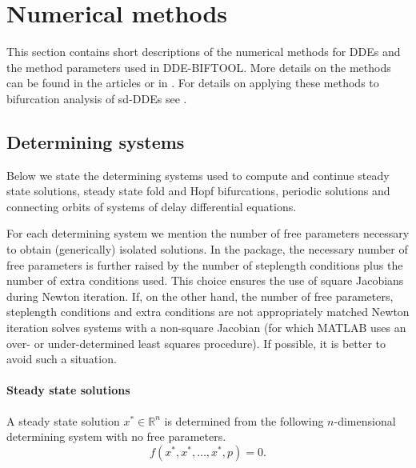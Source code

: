 \documentclass[10pt]{scrartcl}
\newcommand{\DDEBIFCODE}{\textsc{DDE-BIFTOOL}}
\newcommand{\RR}{\mathbb{R}}
\begin{document}
{\section{Numerical methods}\label{numerical_methods}\label{code_num_methods}
This section contains short descriptions of the numerical methods 
for DDEs and the method parameters used in {\DDEBIFCODE}. 
More details on the methods can be found in the
articles \cite{Luzy96,Enge99a,Enge99b,en_d01,engel01,homoclinic} 
or in \cite{Enge00}. For details on applying these methods to bifurcation
analysis of sd-DDEs see \cite{luz01}.

\subsection{Determining systems}\label{determining_systems}

Below we state the determining systems used to compute and
continue steady state solutions, steady state fold and Hopf 
bifurcations, periodic solutions and connecting orbits of systems of delay
differential equations.

For each determining system we mention the number of free 
parameters necessary to obtain (generically) isolated 
solutions. 
In the package,
the necessary number of free parameters
is further raised by the number of
steplength conditions plus the number of extra conditions used.
This choice ensures 
the use of square Jacobians during Newton iteration. 
If, on the other hand, the number of free parameters, 
steplength conditions and extra conditions
are not appropriately matched Newton iteration solves systems with a   
non-square Jacobian (for which MATLAB uses an
over- or under-determined
least squares procedure). 
If possible, it is better to avoid such a situation.

\paragraph{Steady state solutions}
A steady state solution $x^*\in\RR^n$ is determined from the following
$n$-dimensional determining system with no free parameters.
\begin{equation}\label{determ_stst}
f(x^*,x^*,\ldots,x^*,{p})=0.
\end{equation}

}
\end{document}
